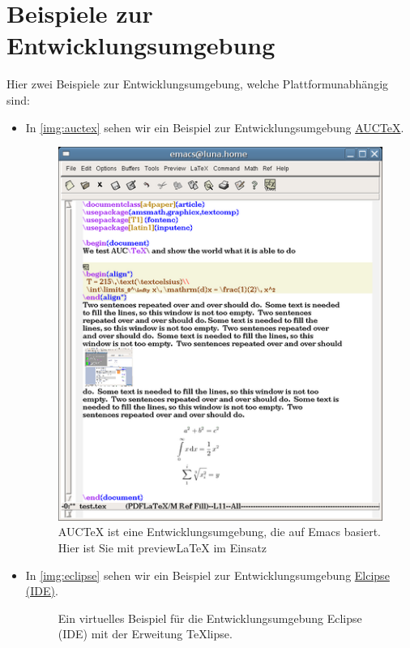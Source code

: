 \section{Beispiele zur Entwicklungsumgebung}
Hier zwei Beispiele zur Entwicklungsumgebung, welche Plattformunabhängig sind:
\begin{itemize}
\item 
In \vref{img:auctex} sehen wir ein Beispiel zur Entwicklungsumgebung \href{https://de.wikipedia.org/wiki/AUCTeX}{AUCTeX}.
\begin{figure}
	\centering
	\includegraphics[width=.5\textwidth]{Auctex}
	\caption[Beispiel zur Entwicklungsumgebung AucTeX.]{AUCTeX ist eine Entwicklungsumgebung, die auf Emacs basiert. Hier ist Sie mit previewLaTeX im Einsatz}
	\label{img:auctex}
\end{figure}
\item
In \vref{img:eclipse} sehen wir ein Beispiel zur Entwicklungsumgebung \href{https://de.wikipedia.org/wiki/Eclipse_(IDE)}{Elcipse (IDE)}.
\begin{figure}
	\centering
	\caption[Eclipse (IDE) mit der Erweiterung TeXlipse.]{Ein virtuelles Beispiel für die Entwicklungsumgebung Eclipse (IDE) mit der Erweitung TeXlipse.}
	\label{img:eclipse}
\end{figure}
\end{itemize}



